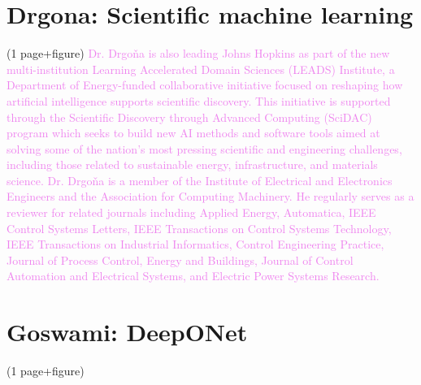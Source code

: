 \documentclass{article}
\begin{document}
\section{Drgona: Scientific machine learning} (1 page+figure) 
\textcolor{violet}{Dr. Drgoňa is also leading Johns Hopkins as part of the new multi-institution Learning Accelerated Domain Sciences (LEADS) Institute, a Department of Energy-funded collaborative initiative focused on reshaping how artificial intelligence supports scientific discovery. This initiative is supported through the Scientific Discovery through Advanced Computing (SciDAC) program which seeks to build new AI methods and software tools aimed at solving some of the nation’s most pressing scientific and engineering challenges, including those related to sustainable energy, infrastructure, and materials science. Dr. Drgoňa is a member of the Institute of Electrical and Electronics Engineers and the Association for Computing Machinery. He regularly serves as a reviewer for related journals including Applied Energy, Automatica, IEEE Control Systems Letters, IEEE Transactions on Control Systems Technology, IEEE Transactions on Industrial Informatics, Control Engineering Practice, Journal of Process Control, Energy and Buildings, Journal of Control Automation and Electrical Systems, and Electric Power Systems Research.}

\section{Goswami: DeepONet} (1 page+figure) 
\end{document}
